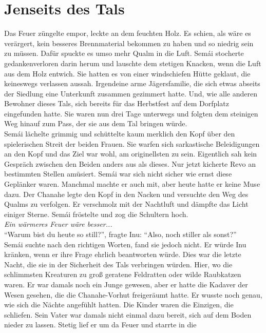 \chapter{Jenseits des Tals}

Das Feuer züngelte empor, leckte an dem feuchten Holz. Es schien, als wäre es verärgert, kein 
besseres Brennmaterial bekommen zu haben und so niedrig sein zu müssen. Dafür spuckte es umso mehr 
Qualm in die Luft. Semái stocherte gedankenverloren darin herum und lauschte dem stetigen Knacken, 
wenn die Luft aus dem Holz entwich. Sie hatten es von einer windschiefen Hütte geklaut, die 
keineswegs verlassen aussah. Irgendeine arme Jägersfamilie, die sich etwas abseits der Siedlung 
eine Unterkunft zusammen gezimmert hatte. Und, wie alle anderen Bewohner dieses Tals, sich bereits 
für das Herbstfest auf dem Dorfplatz eingefunden hatte.
Sie waren nun drei Tage unterwegs und folgten dem steinigen Weg hinauf zum Pass, der sie aus dem 
Tal bringen würde.\\
Semái lächelte grimmig und schüttelte kaum merklich den Kopf über den spielerischen Streit der 
beiden Frauen. Sie warfen sich sarkastische Beleidigungen an den Kopf und das Ziel war wohl, am 
originellsten zu sein. Eigentlich sah kein Gespräch zwischen den Beiden anders aus als dieses. Nur 
jetzt kicherte Revo an bestimmten Stellen amüsiert. Semái war sich nicht sicher wie ernst diese 
Geplänker waren. Manchmal machte er auch mit, aber heute hatte er keine Muse dazu. Der Chanahe legte 
den Kopf in den Nacken und versuchte den Weg des Qualms zu verfolgen. Er verschmolz mit der 
Nachtluft und dämpfte das Licht einiger Sterne. Semái fröstelte und zog die Schultern hoch.\\
\textit{Ein wärmeres Feuer wäre besser...}\\
``Warum bist du heute so still?'', fragte Inu: ``Also, noch stiller als sonst?''\\
Semái suchte nach den richtigen Worten, fand sie jedoch nicht. Er würde Inu kränken, wenn er ihre 
Frage ehrlich beantworten würde. Dies war die letzte Nacht, die sie in der Sicherheit des Tals 
verbringen würden. Hier, wo die schlimmsten Kreaturen zu groß geratene Feldratten oder wilde 
Raubkatzen waren. Er war damals noch ein Junge gewesen, aber er hatte die Kadaver der Wesen 
gesehen, die die Chanahe-Vorhut freigeräumt hatte. Er wusste noch genau, wie sich die Nächte 
angefühlt hatten. Die Kinder waren die Einzigen, die schliefen. Sein Vater war damals nicht einmal 
dazu bereit, sich auf dem Boden nieder zu lassen. Stetig lief er um da Feuer und starrte in die 
